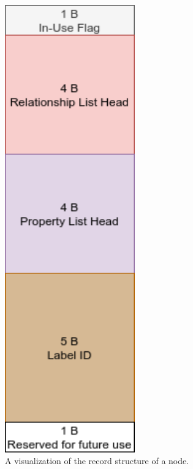 \documentclass[a4paper,10pt]{article}
\begin{document}
    \begin{figure}[htp]\label{node_record}
    \begin{center}
    \includegraphics[keepaspectratio,height=0.4\textheight,width=0.5\textwidth]{img/node_record.png}
    \end{center}
    \caption{A visualization of the record structure of a node.} %
    \end{figure}
    
\end{document}
